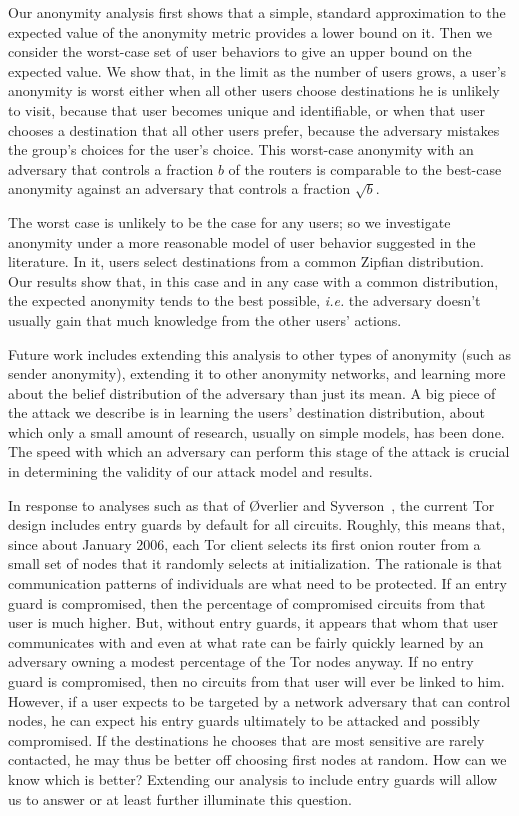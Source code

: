\documentclass[prodmode,acmtissec]{acmsmall}
\begin{document}
Our anonymity analysis first shows that a simple, standard approximation to the expected value of the anonymity metric provides a lower bound on it.  Then we consider the worst-case set of user behaviors to give an upper bound on the expected value.  We show that, in the limit as the number of users grows, a user's anonymity is worst either when all other users choose destinations he is unlikely to visit, because that user becomes unique and identifiable, or when that user chooses a destination that all other users prefer, because the adversary mistakes the group's choices for the user's choice.  This worst-case anonymity with an adversary that controls a fraction $b$ of the routers is comparable to the best-case anonymity against an adversary that controls a fraction $\sqrt{b}$.

The worst case is unlikely to be the case for any users; so we investigate anonymity under a more reasonable model of user behavior suggested in the literature.  In it, users select destinations from a common Zipfian distribution.  Our results show that, in this case and in any case with a common distribution, the expected anonymity tends to the best possible, \emph{i.e.} the adversary doesn't usually gain that much knowledge from the other users' actions.

Future work includes extending this analysis to other types of anonymity (such as sender anonymity), extending it to other anonymity networks, and learning more about the belief distribution of the adversary than just its mean.  A big piece of the attack we describe is in learning the users' destination distribution, about which only a small amount of research, usually on simple models, has been done.  The speed with which an adversary can perform this stage of the attack is crucial in determining the validity of our attack model and results.

In response to analyses such as that of {\O}verlier and
Syverson~, the current Tor design includes
entry guards by default for all circuits. Roughly, this means that,
since about January 2006, each Tor client selects its first onion
router from a small set of nodes that it randomly selects at
initialization. The rationale is that communication patterns of
individuals are what need to be protected. If an entry guard is
compromised, then the percentage of compromised circuits from that
user is much higher. But, without entry guards, it appears that whom
that user communicates with and even at what rate can be fairly
quickly learned by an adversary owning a modest percentage of the Tor
nodes anyway. If no entry guard is compromised, then no circuits from
that user will ever be linked to him. However, if a user expects to be
targeted by a network adversary that can control nodes, he can expect
his entry guards ultimately to be attacked and possibly
compromised. If the destinations he chooses that are most sensitive
are rarely contacted, he may thus be better off choosing first nodes
at random. How can we know which is better? Extending our analysis to
include entry guards will allow us to answer or at least further
illuminate this question.
\end{document}

